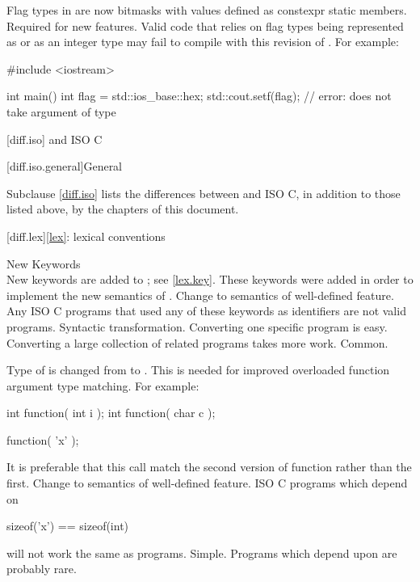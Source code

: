 \change
Flag types in  are now bitmasks with values
defined as constexpr static members.
\rationale
Required for new features.
\effect
Valid \CppIII{} code that relies on  flag types being
represented as  or as an integer type may fail to compile
with this revision of \Cpp{}.
For example:
\begin{codeblock}
#include <iostream>

int main() {
  int flag = std::ios_base::hex;
  std::cout.setf(flag);         // error:  does not take argument of type 
}
\end{codeblock}

[diff.iso]{\Cpp{} and ISO C}

[diff.iso.general]{General}

\pnum
{}%
Subclause \ref{diff.iso} lists the differences between \Cpp{} and ISO C,
in addition to those listed above,
by the chapters of this document.

[diff.lex]{\ref{lex}: lexical conventions}

\change
New Keywords\\
New keywords are added to \Cpp{};
see \ref{lex.key}.
\rationale
These keywords were added in order to implement the new
semantics of \Cpp{}.
\effect
Change to semantics of well-defined feature.
Any ISO C programs that used any of these keywords as identifiers
are not valid \Cpp{} programs.
\difficulty
Syntactic transformation.
Converting one specific program is easy.
Converting a large collection
of related programs takes more work.
\howwide
Common.

\change
Type of  is changed from  to .
\rationale
This is needed for improved overloaded function argument type
matching. For example:
\begin{codeblock}
int function( int i );
int function( char c );

function( 'x' );
\end{codeblock}
It is preferable that this call match the second version of
function rather than the first.
\effect
Change to semantics of well-defined feature.
ISO C programs which depend on
\begin{codeblock}
sizeof('x') == sizeof(int)
\end{codeblock}
will not work the same as \Cpp{} programs.
\difficulty
Simple.
\howwide
Programs which depend upon  are probably rare.

